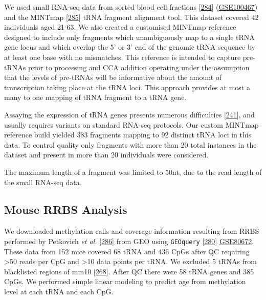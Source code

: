 \documentclass[
]{book}
\begin{document}
We used small RNA-seq data from sorted blood cell fractions {[}\protect\hyperlink{ref-Juzenas2017}{284}{]} (\href{https://www.ncbi.nlm.nih.gov/geo/query/acc.cgi?acc=GSE100467}{GSE100467}) and the MINTmap {[}\protect\hyperlink{ref-Loher2017}{285}{]} tRNA fragment alignment tool.
This dataset covered 42 individuals aged 21-63.
We also created a customised MINTmap reference designed to include only fragments which unambiguously map to a single tRNA gene locus and which overlap the 5' or 3' end of the genomic tRNA sequence by at least one base with no mismatches.
This reference is intended to capture pre-tRNAs prior to processing and CCA addition operating under the assumption that the levels of pre-tRNAs will be informative about the amount of transcription taking place at the tRNA loci.
This approach provides at most a many to one mapping of tRNA fragment to a tRNA gene.

Assaying the expression of tRNA genes presents numerous difficulties {[}\protect\hyperlink{ref-Torres2019}{241}{]}, and usually requires variants on standard RNA-seq protocols.
Our custom MINTmap reference build yielded 383 fragments mapping to 92 distinct tRNA loci in this data.
To control quality only fragments with more than 20 total instances in the dataset and present in more than 20 individuals were considered.

The maximum length of a fragment was limited to 50nt, due to the read length of the small RNA-seq data.

\hypertarget{mousemethods}{%
\subsection{Mouse RRBS Analysis}\label{mousemethods}}

We downloaded methylation calls and coverage information resulting from RRBS performed by Petkovich \emph{et al.} {[}\protect\hyperlink{ref-Petkovich2017}{286}{]} from GEO using \texttt{GEOquery} {[}\protect\hyperlink{ref-Davis2007p}{280}{]} \href{https://www.ncbi.nlm.nih.gov/geo/query/acc.cgi?acc=GSE80672}{GSE80672}.
These data from 152 mice covered 68 tRNA and 436 CpGs after QC requiring \textgreater50 reads per CpG and \textgreater10 data points per tRNA.
We excluded 5 tRNAs from blacklisted regions of mm10 {[}\protect\hyperlink{ref-Amemiya2019}{268}{]}.
After QC there were 58 tRNA genes and 385 CpGs.
We performed simple linear modeling to predict age from methylation level at each tRNA and each CpG.

\newpage
\end{document}
